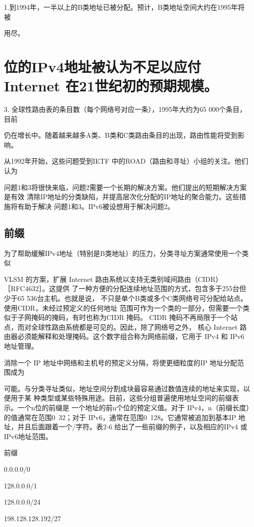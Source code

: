 1.到1994年，一半以上的B类地址已被分配。预计，B类地址空间大约在1995年将被

用尽。

\section{位的IPv4地址被认为不足以应付 Internet 在21世纪初的预期规模。}
3. 全球性路由表的条目数（每个网络号对应一条），1995年大约为65 000个条目，目前

仍在增长中。随着越来越多A类、B类和C类路由条目的出现，路由性能将受到影响。

从1992年开始，这些问题受到IETF 中的ROAD（路由和寻址）小组的关注。他们认为

问题1和3将很快来临，问题2需要一个长期的解决方案。他们提出的短期解决方案是有效
清除IP地址的分类缺陷，并提高层次化分配的IP地址的聚合能力。这些措施将有助于解决
问题1和3。IPv6被设想用于解决问题2。

\subsection{前缀}
为了帮助缓解IPv4地址（特别是B类地址）的压力，分类寻址方案通常使用一个类似

VLSM 的方案，扩展 Internet 路由系统以支持无类别域间路由（CIDR）［RFC4632］。这提供
了一种方便的分配连续地址范围的方式，包含多于255台但少于65 536台主机。也就是说，
不只是单个B类或多个C类网络号可分配给站点。使用CIDR，未经过预定义的任何地址
范围可作为一个类的一部分，但需要一个类似于子网掩码的掩码，有时也称为CIDR 掩码。
CIDR 掩码不再局限于一个站点，而对全球性路由系统都是可见的。因此，除了网络号之外，
核心 Internet 路由器必须能解释和处理掩码。这个数字组合称为网络前缀，它用于 IPv4 和
IPv6地址管理。

消除一个 IP 地址中网络和主机号的预定义分隔，将使更细粒度的IP 地址分配范围成为

可能。与分类寻址类似，地址空间分割成块最容易通过数值连续的地址来实现，以便用于某
种类型或某些特殊用途。目前，这些分组普遍使用地址空间的前缀表示。一个n位的前缀是
一个地址的前n个位的预定义值。对于 IPv4，n（前缀长度）的值通常在范围0~32；对于
IPv6，通常在范围0~128。它通常被追加到基本IP 地址，并且后面跟着一个/字符。表2-6
给出了一些前缀的例子，以及相应的IPv4 或IPv6地址范围。

前缀

0.0.0.0/0

128.0.0.0/1

128.0.0.0/24

198.128.128.192/27


